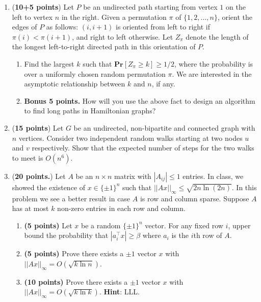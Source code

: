 \documentclass[11pt]{article}
\def\Pr{\mathbf{Pr}}
\def\Pr{\mathbf{Pr}}
\begin{document}
\begin{enumerate}
\vspace{.5in}

	
\item ({\bf 10+5 points})
Let $P$ be an undirected path starting from vertex $1$ on the left to vertex $n$ in the right. Given a permutation $\pi$ of $\{1,2,\ldots,n\}$, orient the edges of $P$
as follows: $(i,i+1)$ is oriented from left to right if $\pi(i) < \pi(i+1)$, and right to left otherwise. Let $Z_\pi$ denote the length of the longest left-to-right directed path in this orientation of $P$.
\begin{enumerate}
	\item Find the largest $k$ such that $\Pr[Z_\pi \geq k] \geq 1/2$, where the probability is over a uniformly chosen random permutation $\pi$. We are interested in the asymptotic relationship between $k$ and $n$, if any.
	\item {\bf Bonus 5 points.} How will you use the above fact to design an algorithm to find long paths in Hamiltonian graphs?
\end{enumerate}


\vspace{.5in}


\item ({\bf 15 points})
Let $G$ be an undirected, non-bipartite and  connected graph with $n$ vertices. Consider two independent random walks starting at two nodes $u$ and $v$ respectively. Show that the expected number of steps for the two walks to meet is $O(n^6)$.

\vspace{.5in}


\item ({\bf 20 points.})
Let $A$ be an $n\times n$ matrix with $|A_{ij}| \leq 1$ entries. In class, we showed the existence of $x\in \{\pm 1\}^n$ such that $||Ax||_\infty \leq \sqrt{2n\ln(2n)}$.
In this problem we see a better result in case $A$ is row and column sparse. Suppose $A$ has at most $k$ non-zero entries in each row and column.
\begin{enumerate}
	\item \textbf{(5 points)} Let $x$ be a random $\{\pm 1\}^n$ vector. For any fixed row $i$, upper bound the probability that $|a_i^\top x| \geq \beta$ where $a_i$ is the $i$th row of $A$.
	\item \textbf{(5 points)} Prove there exists a $\pm 1$ vector $x$ with $||Ax||_\infty = O(\sqrt{k\ln n})$.
	\item \textbf{(10 points)} Prove there exists a $\pm 1$ vector $x$ with $||Ax||_\infty = O(\sqrt{k\ln k})$. \textbf{Hint}: LLL.
\end{enumerate}






\end{enumerate}
\end{document}
